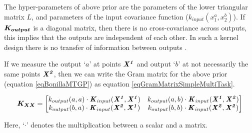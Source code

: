 The hyper-parameters of above prior are the parameters of the lower triangular matrix $L$, and parameters of the input  covariance function ($k_{input}(x_{1}^{a}, x_{2}^{b})$). If $\boldsymbol{K_{output}}$ is a diagonal matrix, then there is no cross-covariance across outputs, this implies that the outputs are independent of each other. In such a kernel design there is no transfer of information between outputs \cite{bonilla2007multi, o1998markov}.

If we measure the output `$a$' at points $\bm{\mathit{X^1}}$ and output `$b$' at not necessarily the same points $\bm{\mathit{X^2}}$, then we can write the Gram matrix for the above prior (equation \ref{eqBonillaMTGP}) as equation \ref{eqGramMatrixSimpleMultiTask}.

\begin{equation}\label{eqGramMatrixSimpleMultiTask}
   \boldsymbol{K_{XX}} =  \begin{bmatrix} k_{output}(a, a) \cdot \bm{\mathit{K}}_{input}(\bm{\mathit{X^1}}, \bm{\mathit{X^1}}) & 
k_{output}(a, b) \cdot \bm{\mathit{K}}_{input}(\bm{\mathit{X^1}}, \bm{\mathit{X^2}}) \\ 
k_{output}(b, a) \cdot \bm{\mathit{K}}_{input}(\bm{\mathit{X^2}}, \bm{\mathit{X^1}}) &
k_{output}(b, b) \cdot \bm{\mathit{K}}_{input}(\bm{\mathit{X^2}}, \bm{\mathit{X^2}}) 
\end{bmatrix}
\end{equation}


Here, `$\cdot$' denotes the multiplication between a scalar and a matrix. 

